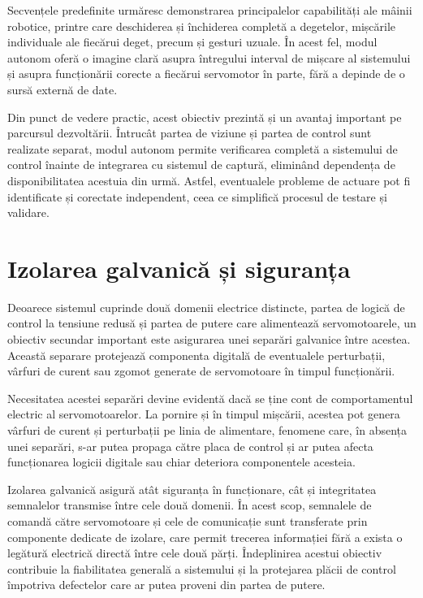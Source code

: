 Secvențele predefinite urmăresc demonstrarea principalelor capabilități ale mâinii
robotice, printre care deschiderea și închiderea completă a degetelor, mișcările
individuale ale fiecărui deget, precum și gesturi uzuale. În acest fel, modul autonom oferă o
imagine clară asupra întregului interval de mișcare al sistemului și asupra
funcționării corecte a fiecărui servomotor în parte, fără a depinde de o sursă
externă de date.

Din punct de vedere practic, acest obiectiv prezintă și un avantaj important pe
parcursul dezvoltării. Întrucât partea de viziune și partea de control sunt
realizate separat, modul autonom permite verificarea completă a sistemului de
control înainte de integrarea cu sistemul de captură, eliminând dependența de
disponibilitatea acestuia din urmă. Astfel, eventualele probleme de actuare pot fi
identificate și corectate independent, ceea ce simplifică procesul de testare și
validare.

\section{Izolarea galvanică și siguranța}
\label{sec:obj-izolare}

Deoarece sistemul cuprinde două domenii electrice distincte, partea de logică de
control la tensiune redusă și partea de putere care alimentează servomotoarele,
un obiectiv secundar important este asigurarea unei separări galvanice între
acestea. Această separare protejează componenta digitală de eventualele
perturbații, vârfuri de curent sau zgomot generate de servomotoare în timpul
funcționării.

Necesitatea acestei separări devine evidentă dacă se ține cont de comportamentul
electric al servomotoarelor. La pornire și în timpul mișcării, acestea pot
genera vârfuri de curent și perturbații pe linia de alimentare, fenomene care, în
absența unei separări, s-ar putea propaga către placa de control și ar putea
afecta funcționarea logicii digitale sau chiar deteriora componentele acesteia.

Izolarea galvanică asigură atât siguranța în funcționare, cât și integritatea
semnalelor transmise între cele două domenii. În acest scop, semnalele de comandă
către servomotoare și cele de comunicație sunt transferate prin componente
dedicate de izolare, care permit trecerea informației fără a exista o legătură
electrică directă între cele două părți. Îndeplinirea acestui obiectiv contribuie
la fiabilitatea generală a sistemului și la protejarea plăcii de control împotriva
defectelor care ar putea proveni din partea de putere.

